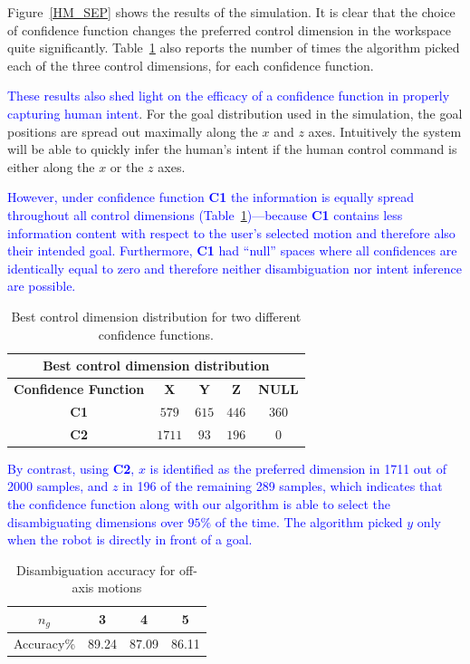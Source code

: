 \documentclass[conference]{IEEEtran}
\begin{document}
Figure~\ref{HM_SEP} shows the results of the simulation. It is clear that the choice of confidence function changes the preferred control dimension in the workspace quite significantly. Table~\ref{HMD} also reports the number of times the algorithm picked each of the three control dimensions, for each confidence function.

\textcolor{blue}{These results also shed light on the efficacy of a confidence function in properly capturing human intent}. For the goal distribution used in the simulation, the goal positions are spread out maximally along the $x$ and $z$ axes. Intuitively the system will be able to quickly infer the human's intent if the human control command is either along the $x$ or the $z$ axes. 

\textcolor{blue}{However, under confidence function \textbf{C1} the information is equally spread throughout all control dimensions (Table~\ref{HMD})---because \textbf{C1} contains less information content with respect to the user's selected motion and therefore also their intended goal. Furthermore, \textbf{C1} had ``null'' spaces where all confidences are identically equal to zero and therefore neither disambiguation nor intent inference are possible.}
\begin{table}[t]
	\centering
	\begin{tabular}{|c|c|c|c|c|}
		\hline
		\multicolumn{5}{|c|}{Best control dimension distribution} \\
		\hline
		\textbf{Confidence Function} & \textbf{X} & \textbf{Y} & \textbf{Z} & \textbf{NULL} \\ \hline
		
		\textbf{C1} & $579$ & $615$ & $446$ & $360$ \\ \hline
		\textbf{C2} & $1711$ & $93$ & $196$ & $0$\\ \hline
		
	\end{tabular}
	\vspace{.2cm}
	\caption{Best control dimension distribution for two different confidence functions.} 
	\label{HMD}
	\vspace{-.5cm}
\end{table}

\textcolor{blue}{By contrast, using \textbf{C2},  $x$ is identified as the preferred dimension in 1711 out of 2000 samples, and $z$ in 196 of the remaining 289 samples, which indicates that the confidence function along with our algorithm is able to select the disambiguating dimensions over $95\%$ of the time. The algorithm picked $y$ only when the robot is directly in front of a goal.}
\begin{table}[b]
	\centering
	\begin{tabular}{|c|c|c|c|}
		\hline
		$n_g$ & 3 & 4 & 5 \\
		\hline
		Accuracy\% & 89.24 & 87.09 & 86.11 \\
		\hline
	\end{tabular}
	\vspace{.2cm}
	\caption{Disambiguation accuracy for off-axis motions} 
	\label{SIM}
	\vspace{-.5cm}
\end{table}
\end{document}
